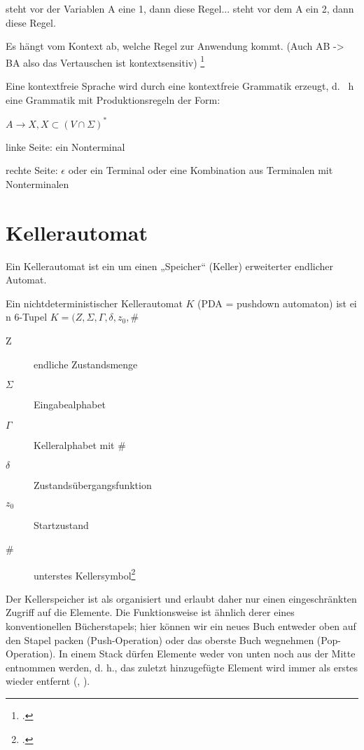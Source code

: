 \documentclass{lehramt-informatik-haupt}
\begin{document}
steht vor der Variablen A eine 1, dann
diese Regel...
steht vor dem A ein 2, dann diese Regel.

Es hängt vom Kontext ab, welche Regel zur Anwendung kommt.
(Auch AB -> BA also das Vertauschen ist kontextsensitiv)
\footcite[Seite 9]{theo:fs:2}

Eine kontextfreie Sprache wird durch eine kontextfreie Grammatik
erzeugt, d. \, h eine Grammatik mit Produktionsregeln der Form:

$A \rightarrow X, X \subset (V \cap \Sigma)^*$

linke Seite: ein Nonterminal

rechte Seite: $\epsilon$ oder ein Terminal oder eine
Kombination aus Terminalen mit
Nonterminalen

%

\section{Kellerautomat}

Ein Kellerautomat ist ein um einen „Speicher“ (Keller) erweiterter
endlicher Automat.

Ein nichtdeterministischer Kellerautomat $K$ (PDA = pushdown automaton)
ist ei n 6-Tupel $K = (Z, \Sigma, \Gamma, \delta, z_0 , \#$

\begin{description}
\item[Z] endliche Zustandsmenge
\item[$\Sigma$] Eingabealphabet
\item[$\Gamma$] Kelleralphabet mit \#
\item[$\delta$] Zustandsübergangsfunktion
\item[$z_0$] Startzustand
\item[\#] unterstes Kellersymbol\footcite[Seite 22]{theo:fs:2}
\end{description}

Der Kellerspeicher ist als  organisiert und
erlaubt daher nur einen eingeschränkten Zugriff auf die Elemente. Die
Funktionsweise ist ähnlich derer eines konventionellen Bücherstapels;
hier können wir ein neues Buch entweder oben auf den Stapel packen
(Push-Operation) oder das oberste Buch wegnehmen (Pop-Operation). In
einem Stack dürfen Elemente weder von unten noch aus der Mitte entnommen
werden, d. h., das zuletzt hinzugefügte Element wird immer als erstes
wieder entfernt (, ).
\end{document}
